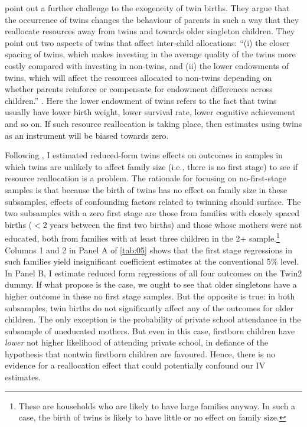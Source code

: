 \textcite{rosenzweig_population_2009} point out a further challenge to the exogeneity of twin births. They argue that the occurrence of twins changes the behaviour of parents in such a way that they reallocate resources away from twins and towards older singleton children. They point out two aspects of twins that affect inter-child allocations: \enquote{(i) the closer spacing of twins, which makes investing in the average quality of the twins more costly compared with investing in non-twins, and (ii) the lower endowments of twins, which will affect the resources allocated to non-twins depending on whether parents reinforce or compensate for endowment differences across children.} \parencite[p. 1152]{rosenzweig_population_2009}. Here the lower endowment of twins refers to the fact that twins usually have lower birth weight, lower survival rate, lower cognitive achievement and so on. If such resource reallocation is taking place, then estimates using twins as an instrument will be biased towards zero.

Following \textcite{angrist_multiple_2010}, I estimated reduced-form twins effects on outcomes in samples in which twins are unlikely to affect family size (i.e., there is no first stage) to see if resource reallocation is a problem. The rationale for focusing on no-first-stage samples is that because the birth of twins has no effect on family size in these subsamples, effects of confounding factors related to twinning should surface. The two subsamples with a zero first stage are those from families with closely spaced births ($ < 2 $ years between the first two births) and those whose mothers were not educated, both from families with at least three children in the 2+ sample.\footnote{These are households who are likely to have large families anyway. In such a case, the birth of twins is likely to have little or no effect on family size.} Columns 1 and 2 in Panel A of \autoref{tab:05} shows that the first stage regressions in such families yield insignificant coefficient estimates at the conventional 5\% level. In Panel B, I estimate reduced form regressions of all four outcomes on the Twin2 dummy. If what \textcite{rosenzweig_population_2009} propose is the case, we ought to see that older singletons have a higher outcome in these no first stage samples. But the opposite is true: in both subsamples, twin births do not significantly affect any of the outcomes for older children. The only exception is the probability of private school attendance in the subsample of uneducated mothers. But even in this case, firstborn children have \textit{lower} not higher likelihood of attending private school, in defiance of the hypothesis that nontwin firstborn children are favoured. Hence, there is no evidence for a reallocation effect that could potentially confound our IV estimates.  

